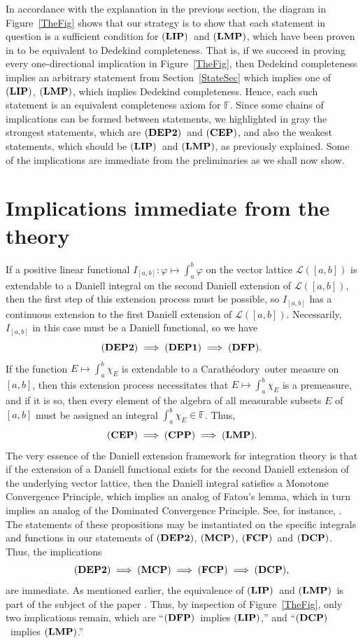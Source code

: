 \documentclass[11pt,a4paper]{article}
\def\DCP{\ensuremath{{\bf(DCP_{A})}}}
\def\CEP{\ensuremath{{\bf(CEP)}}}
\def\iDEP{\ensuremath{{\bf(DEP1)}}}
\def\iiDEP{\ensuremath{{\bf(DEP2)}}}
\def\F{\mathbb{F}}
\def\MCP{\ensuremath{{\bf(MCP)}}}
\def\FCP{\ensuremath{{\bf(FCP)}}}
\def\DCP{\ensuremath{{\bf(DCP)}}}
\def\DFP{\ensuremath{{\bf(DFP)}}}
\def\CPP{\ensuremath{{\bf(CPP)}}}
\def\LIP{\ensuremath{{\bf(LIP)}}}
\def\LMP{\ensuremath{{\bf(LMP)}}}
\def\lbrak{\left[}
\def\rbrak{\right]}
\def\abClosed{\lbrak a,b\rbrak}
\def\stepLatt{\mathcal{L}}
\def\elemLatt{\stepLatt(\abClosed)}
\def\elemI{I_{\abClosed}}
\def\Cara{Carath\'{e}odory\  }
\begin{document}
In accordance with the explanation in the previous section, the diagram in Figure~\ref{TheFig} shows that our strategy is to show that each statement in question is a sufficient condition for \LIP\  and \LMP, which have been proven in \cite[Theorem~1]{can24} to be equivalent to Dedekind completeness. That is, if we succeed in proving every one-directional implication in Figure~\ref{TheFig}, then Dedekind completeness implies an arbitrary statement from Section~\ref{StateSec} which implies one of \LIP, \LMP, which implies Dedekind completeness. Hence, each such statement is an equivalent completeness axiom for $\F$. Since some chains of implications can be formed between statements, we highlighted in gray the strongest statements, which are \iiDEP\  and \CEP, and also the weakest statements, which should be \LIP\  and \LMP, as previously explained. Some of the implications are immediate from the preliminaries as we shall now show.

\section{Implications immediate from the theory}\label{ImpliesSec}

If a positive linear functional $\elemI:\varphi\mapsto\int_a^b\varphi$ on the vector lattice $\elemLatt$ is extendable to a Daniell integral on the second Daniell extension of $\elemLatt$, then the first step of this extension process must be possible, so $\elemI$ has a continuous extension to the first Daniell extension of $\elemLatt$. Necessarily, $\elemI$ in this case must be a Daniell functional, so we have
\[\iiDEP\implies\iDEP\implies\DFP.\]
If the function $E\mapsto\int_a^b\chi_E$ is extendable to a \Cara outer measure on $\abClosed$, then this extension process necessitates that $E\mapsto\int_a^b\chi_E$ is a premeasure, and if it is so, then every element of the algebra of all measurable subsets $E$ of $\abClosed$ must be assigned an integral $\int_a^b\chi_E\in\F$. Thus,
\[\CEP\implies\CPP\implies\LMP.\]
The very essence of the Daniell extension framework for integration theory is that if the extension of a Daniell functional exists for the second Daniell extension of the underlying vector lattice, then the Daniell integral satisfies a Monotone Convergence Principle, which implies an analog of Fatou's lemma, which in turn implies an analog of the Dominated Convergence Principle. See, for instance, \cite[Propositions~10,12,13]{roy88}. The statements of these propositions may be instantiated on the specific integrals and functions in our statements of \iiDEP, \MCP, \FCP\  and \DCP. Thus, the implications
\[\iiDEP\implies\MCP\implies\FCP\implies\DCP,\]
are immediate. As mentioned earlier, the equivalence of \LIP\  and \LMP\  is part of the subject of the paper \cite{can24}. Thus, by inspection of Figure~\ref{TheFig}, only two implications remain, which are ``\DFP\  implies \LIP,'' and ``\DCP\  implies \LMP.''
\end{document}
